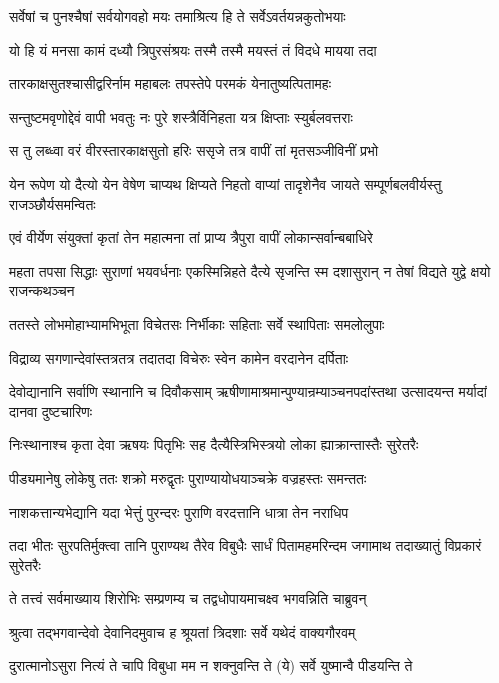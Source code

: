 \twolineshloka
{सर्वेषां च पुनश्चैषां सर्वयोगवहो मयः}
{तमाश्रित्य हि ते सर्वेऽवर्तयन्नकुतोभयाः}


\twolineshloka
{यो हि यं मनसा कामं दध्यौ त्रिपुरसंश्रयः}
{तस्मै तस्मै मयस्तं तं विदधे मायया तदा}


\twolineshloka
{तारकाक्षसुतश्चासीद्वरिर्नाम महाबलः}
{तपस्तेपे परमकं येनातुष्यत्पितामहः}


\twolineshloka
{सन्तुष्टमवृणोद्देवं वापी भवतुः नः पुरे}
{शस्त्रैर्विनिहता यत्र क्षिप्ताः स्युर्बलवत्तराः}


\twolineshloka
{स तु लब्ध्वा वरं वीरस्तारकाक्षसुतो हरिः}
{ससृजे तत्र वापीं तां मृतसञ्जीविनीं प्रभो}


\threelineshloka
{येन रूपेण यो दैत्यो येन वेषेण चाप्यथ}
{क्षिप्यते निहतो वाप्यां तादृशेनैव जायते}
{सम्पूर्णबलवीर्यस्तु राजञ्छौर्यसमन्वितः}


\twolineshloka
{एवं वीर्येण संयुक्तां कृतां तेन महात्मना}
{तां प्राप्य त्रैपुरा वापीं लोकान्सर्वान्बबाधिरे}


\threelineshloka
{महता तपसा सिद्धाः सुराणां भयवर्धनाः}
{एकस्मिन्निहते दैत्ये सृजन्ति स्म दशासुरान्}
{न तेषां विद्यते युद्वे क्षयो राजन्कथञ्चन}


\twolineshloka
{ततस्ते लोभमोहाभ्यामभिभूता विचेतसः}
{निर्भीकाः सहिताः सर्वे स्थापिताः समलोलुपाः}


\twolineshloka
{विद्राव्य सगणान्देवांस्तत्रतत्र तदातदा}
{विचेरुः स्वेन कामेन वरदानेन दर्पिताः}


\threelineshloka
{देवोद्यानानि सर्वाणि स्थानानि च दिवौकसाम्}
{ऋषीणामाश्रमान्पुण्यान्रम्याञ्चनपदांस्तथा}
{उत्सादयन्त मर्यादां दानवा दुष्टचारिणः}


\twolineshloka
{निःस्थानाश्च कृता देवा ऋषयः पितृभिः सह}
{दैत्यैस्त्रिभिस्त्रयो लोका ह्याक्रान्तास्तैः सुरेतरैः}


\twolineshloka
{पीड्यमानेषु लोकेषु ततः शक्रो मरुद्वृतः}
{पुराण्यायोधयाञ्चक्रे वज्रहस्तः समन्ततः}


\twolineshloka
{नाशकत्तान्यभेद्यानि यदा भेत्तुं पुरन्दरः}
{पुराणि वरदत्तानि धात्रा तेन नराधिप}


\threelineshloka
{तदा भीतः सुरपतिर्मुक्त्वा तानि पुराण्यथ}
{तैरेव विबुधैः सार्धं पितामहमरिन्दम}
{जगामाथ तदाख्यातुं विप्रकारं सुरेतरैः}


\twolineshloka
{ते तत्त्वं सर्वमाख्याय शिरोभिः सम्प्रणम्य च}
{तद्वधोपायमाचक्ष्व भगवन्निति चाब्रुवन्}


\twolineshloka
{श्रुत्वा तद्भगवान्देवो देवानिदमुवाच ह}
{श्रूयतां त्रिदशाः सर्वे यथेदं वाक्यगौरवम्}


\twolineshloka
{दुरात्मानोऽसुरा नित्यं ते चापि विबुधा मम}
{न शक्नुवन्ति ते (ये) सर्वे युष्मान्वै पीडयन्ति ते}


